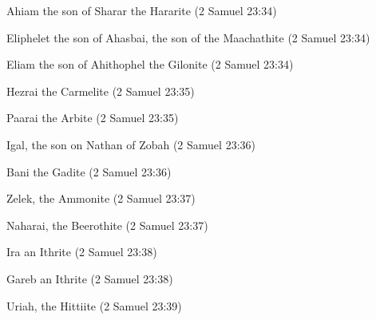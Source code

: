 \begin{compactenum}[1.]
	\item Ahiam the son of Sharar the Hararite (2 Samuel 23:34)
	\item Eliphelet the son of Ahasbai, the son of the Maachathite (2 Samuel 23:34)
	\item Eliam the son of Ahithophel the Gilonite (2 Samuel 23:34)
	\item Hezrai the Carmelite (2 Samuel 23:35)
	\item Paarai the Arbite (2 Samuel 23:35)
	\item Igal, the son on Nathan of Zobah  (2 Samuel 23:36)
	\item Bani the Gadite  (2 Samuel 23:36)
	\item Zelek, the Ammonite (2 Samuel 23:37)
	\item Naharai, the Beerothite (2 Samuel 23:37)
	\item Ira an Ithrite (2 Samuel 23:38)
	\item Gareb an Ithrite (2 Samuel 23:38)
	\item Uriah, the Hittiite (2 Samuel 23:39)
\end{compactenum}

